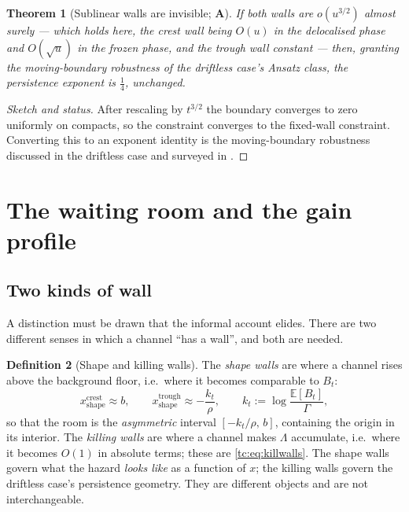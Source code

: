 \documentclass[11pt]{article}
\numberwithin{equation}{section}
\theoremstyle{plain}
\newtheorem{theorem}{Theorem}[section]
\theoremstyle{definition}
\newtheorem{definition}[theorem]{Definition}
\theoremstyle{remark}
\newcommand{\E}{\mathbb{E}}
\begin{document}
\begin{theorem}[Sublinear walls are invisible; \textbf{A}]
\label{tc:thm:sublinear}
If both walls are $o(u^{3/2})$ almost surely --- which holds here, the
crest wall being $O(u)$ in the delocalised phase and $O(\sqrt u)$ in the
frozen phase, and the trough wall constant --- then, granting the
moving-boundary robustness of the driftless case's Ansatz class, the
persistence exponent is $\tfrac14$, unchanged.
\end{theorem}

\begin{proof}[Sketch and status]
After rescaling by $t^{3/2}$ the boundary converges to zero uniformly on
compacts, so the constraint converges to the fixed-wall constraint.
Converting this to an exponent identity is the moving-boundary
robustness discussed in the driftless case and surveyed in \cite{AS15}.
\end{proof}

\section{The waiting room and the gain profile}\label{app:room}

\label{tc:sub:room}

\subsection{Two kinds of wall}\label{tc:subsub:twowalls}

A distinction must be drawn that the informal account elides. There are
two different senses in which a channel ``has a wall'', and both are
needed.

\begin{definition}[Shape and killing walls]\label{tc:def:walls}
The \emph{shape walls} are where a channel rises above the background
floor, i.e.\ where it becomes comparable to $B_t$:
\begin{equation}\label{tc:eq:shapewalls}
x^{\mathrm{crest}}_{\mathrm{shape}}\approx b,
\qquad
x^{\mathrm{trough}}_{\mathrm{shape}}\approx-\frac{k_t}{\rho},
\qquad
k_t:=\log\frac{\E[B_t]}{\Gamma},
\end{equation}
so that the room is the \emph{asymmetric} interval $[-k_t/\rho,\,b]$,
containing the origin in its interior.
The \emph{killing walls} are where a channel makes $\Lambda$ accumulate,
i.e.\ where it becomes $O(1)$ in absolute terms; these are
\eqref{tc:eq:killwalls}. The shape walls govern what the hazard
\emph{looks like} as a function of $x$; the killing walls govern
the driftless case's persistence geometry. They are different objects and are
not interchangeable.
\end{definition}
\end{document}
